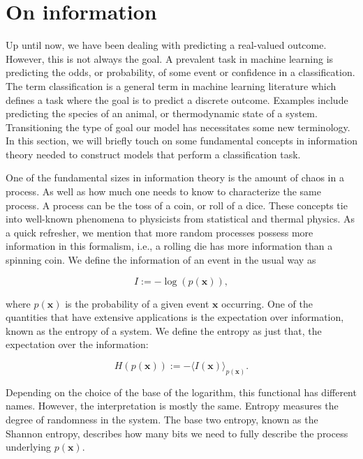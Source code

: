 
\section{On information}\label{sec:information}

Up until now, we have been dealing with predicting a real-valued outcome. However,  this is not always the goal. A prevalent task in machine learning is predicting the odds, or probability, of some event or confidence in a classification. The term classification is a general term in machine learning literature which defines a task where the goal is to predict a discrete outcome. Examples include predicting the species of an animal, or thermodynamic state of a system. Transitioning the type of goal our model has necessitates some new terminology. In this section, we will briefly touch on some fundamental concepts in information theory needed to construct models that perform a classification task.

One of the fundamental sizes in information theory is the amount of chaos in a process.  As well as how much one needs to know to characterize the same process.  A process can be the toss of a coin, or roll of a dice. These concepts tie into well-known phenomena to physicists from statistical and thermal physics. As a quick refresher, we mention that more random processes possess more information in this formalism, i.e., a rolling die has more information than a spinning coin. We define the information of an event in the usual way as 

\begin{equation}
I := -\log(p(\mathbf{x})),
\end{equation} 

\noindent where $p(\mathbf{x})$ is the probability of a given event $\mathbf{x}$ occurring. One of the quantities that have extensive applications is the expectation over information, known as the entropy of a system. We define the entropy as just that, the expectation over the information:

\begin{equation}
H(p(\mathbf{x})):= -\langle I(\mathbf{x}) \rangle_{p(\mathbf{x})}.
\end{equation}

\noindent Depending on the choice of the base of the logarithm, this functional has different names. However, the interpretation is mostly the same. Entropy measures the degree of randomness in the system. The base two entropy, known as the Shannon entropy, describes how many bits we need to fully describe the process underlying $p(\mathbf{x})$. 

